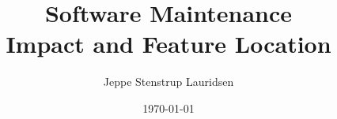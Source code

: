\documentclass[12pt]{article}
\title{%
Software Maintenance \\
\large Impact and Feature Location}
\author{Jeppe Stenstrup Lauridsen}
\date{\today}
\begin{document}
\begin{titlepage}
\clearpage\maketitle
\thispagestyle{empty}
\end{titlepage}


\end{document}

